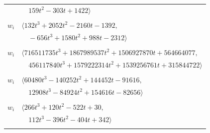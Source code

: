 \documentclass[11pt]{article}
\begin{document}
\begin{longtable}{@{}ll@{}}
 & $\quad 159t^{2}-303t+1422\rangle$\\
\addlinespace[2pt]
\multicolumn{2}{@{}p{0.97\textwidth}@{}}{$i=75$, $D_i=1$, $\rho_{ij}$: $11{:}2, \allowbreak 16{:}1, \allowbreak 19{:}1, \allowbreak 33{:}1, \allowbreak 36{:}2, \allowbreak 37{:}1, \allowbreak 52{:}1, \allowbreak 61{:}1, \allowbreak 67{:}2, \allowbreak 68{:}2, \allowbreak 71{:}1, \allowbreak 79{:}1, \allowbreak 85{:}1, \allowbreak 86{:}2$}\\
$w_i$ & $\langle 132t^{3}+2052t^{2}-2160t-1392,$\\
 & $\quad -656t^{3}+1580t^{2}+988t-2312\rangle$\\
\addlinespace[2pt]
\multicolumn{2}{@{}p{0.97\textwidth}@{}}{$i=76$, $D_i=1$, $\rho_{ij}$: $3{:}1, \allowbreak 4{:}1, \allowbreak 17{:}2, \allowbreak 26{:}1, \allowbreak 30{:}2, \allowbreak 33{:}2, \allowbreak 39{:}2, \allowbreak 50{:}2, \allowbreak 55{:}1, \allowbreak 60{:}2, \allowbreak 61{:}2, \allowbreak 73{:}1, \allowbreak 74{:}1, \allowbreak 82{:}1, \allowbreak 93{:}2, \allowbreak 96{:}1, \allowbreak 97{:}2$}\\
$w_i$ & $\langle 716511735t^{3}+1867989537t^{2}+1506927870t+564664077,$\\
 & $\quad 456117840t^{3}+1579222314t^{2}+1539256761t+315844722\rangle$\\
\addlinespace[2pt]
\multicolumn{2}{@{}p{0.97\textwidth}@{}}{$i=77$, $D_i=1$, $\rho_{ij}$: $1{:}2, \allowbreak 2{:}2, \allowbreak 5{:}1, \allowbreak 11{:}1, \allowbreak 16{:}2, \allowbreak 18{:}1, \allowbreak 19{:}2, \allowbreak 36{:}2, \allowbreak 39{:}1, \allowbreak 50{:}1, \allowbreak 53{:}1, \allowbreak 56{:}1, \allowbreak 60{:}2, \allowbreak 61{:}1, \allowbreak 71{:}2, \allowbreak 79{:}2, \allowbreak 83{:}2, \allowbreak 88{:}2, \allowbreak 91{:}1, \allowbreak 95{:}1$}\\
$w_i$ & $\langle 60480t^{3}-140252t^{2}+144452t-91616,$\\
 & $\quad 12908t^{3}-84924t^{2}+154616t-82656\rangle$\\
\addlinespace[2pt]
\multicolumn{2}{@{}p{0.97\textwidth}@{}}{$i=78$, $D_i=1$, $\rho_{ij}$: $17{:}2, \allowbreak 19{:}1, \allowbreak 36{:}1, \allowbreak 50{:}2, \allowbreak 56{:}2, \allowbreak 61{:}2, \allowbreak 68{:}1, \allowbreak 69{:}1, \allowbreak 84{:}1$}\\
$w_i$ & $\langle 266t^{3}+120t^{2}-522t+30,$\\
 & $\quad 112t^{3}-396t^{2}-404t+342\rangle$\\
\addlinespace[2pt]
\multicolumn{2}{@{}p{0.97\textwidth}@{}}{$i=79$, $D_i=1$, $\rho_{ij}$: $33{:}1, \allowbreak 39{:}1, \allowbreak 40{:}2, \allowbreak 42{:}2, \allowbreak 55{:}2, \allowbreak 60{:}1, \allowbreak 61{:}1, \allowbreak 69{:}2, \allowbreak 70{:}2, \allowbreak 75{:}2, \allowbreak 77{:}1, \allowbreak 85{:}1, \allowbreak 89{:}1, \allowbreak 90{:}1, \allowbreak 93{:}2, \allowbreak 94{:}2, \allowbreak 96{:}1$}\\

\end{longtable}
\end{document}
